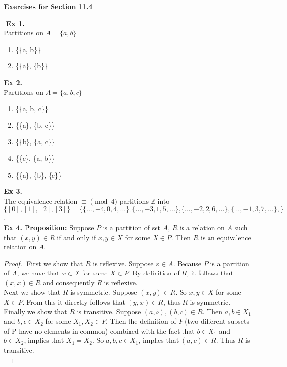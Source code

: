 \documentclass{article}
\date{}
\author{}
\begin{document}
\centerline{\textbf{Exercises for Section 11.4}}
$ $\newline
\textbf{Ex 1.}\\
Partitions on $A=\{a,b\}$
\begin{enumerate}
\item \{\{a, b\}\}
\item \{\{a\}, \{b\}\}
\end{enumerate}
\textbf{Ex 2.}\\
Partitions on $A=\{a,b,c\}$
\begin{enumerate}
\item \{\{a, b, c\}\}
\item \{\{a\}, \{b, c\}\}
\item \{\{b\}, \{a, c\}\}
\item \{\{c\}, \{a, b\}\}
\item \{\{a\}, \{b\}, \{c\}\}
\end{enumerate}
\textbf{Ex 3.}\\
The equivalence relation $\equiv \pmod{4}$ partitions $\mathbb{Z}$ into\\ $\{[0], [1], [2], [3]\}=\{\{...,-4,0,4,...\},\{...,-3,1,5,...\},\{...,-2,2,6,...\}, \{...,-1,3,7,...\},\}$.\\

\noindent \textbf{Ex 4. Proposition:} Suppose $P$ is a partition of set $A$, $R$ is a relation on $A$ such that $(x, y) \in R$ if and only if $x, y \in X$ for some $X \in P$. Then $R$ is an equivalence relation on $A$.
\begin{proof}
$ $\newline
First we show that $R$ is reflexive. Suppose $x \in A$. Because $P$ is a partition of $A$, we have that $x \in X$ for some $X \in P$. By definition of $R$, it follows that $(x, x) \in R$ and consequently $R$ is reflexive.\\

\noindent Next we show that $R$ is symmetric. Suppose $(x, y) \in R$. So $x, y \in X$ for some $X \in P$. From this it directly follows that $(y, x) \in R$, thus $R$ is symmetric.\\

\noindent Finally we show that $R$ is transitive. Suppose $(a, b), (b,c) \in R$. Then $a,b \in X_1$ and $b, c \in X_2$ for some $X_1, X_2 \in P$. Then the definition of $P$ (two different subsets of P have no elements in common) combined with the fact that $b \in X_1$ and $b \in X_2$, implies that $X_1=X_2$. So $a, b, c \in X_1$, implies that $(a, c) \in R$. Thus $R$ is transitive.\\

\end{proof}
\end{document}
